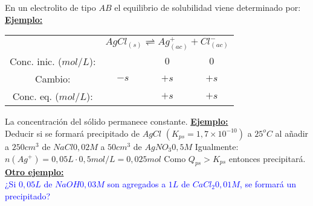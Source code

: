     \sangria{} En un electrolito de tipo $AB$ el equilibrio de solubilidad viene determinado por: \\
    \textbf{\underline{Ejemplo:}}
    \begin{center}
        \begin{tabular}{cccc}
            \multicolumn{1}{c}{} &
            \multicolumn{3}{c}{$AgCl_{(s)} \rightleftharpoons Ag^+_{(ac)} + Cl^-_{(ac)}$} \\

            \multicolumn{1}{c}{Conc. inic. ($mol/L$):} &
            \multicolumn{1}{c}{} &
            \multicolumn{1}{c}{$0$} &
            \multicolumn{1}{c}{$0$} \\

            \multicolumn{1}{c}{Cambio:} &
            \multicolumn{1}{c}{$-s$} &
            \multicolumn{1}{c}{$+s$} &
            \multicolumn{1}{c}{$+s$} \\ \midrule

            \multicolumn{1}{c}{Conc. eq. ($mol/L$):} &
            \multicolumn{1}{c}{} &
            \multicolumn{1}{c}{$+s$} &
            \multicolumn{1}{c}{$+s$} \\
            
        \end{tabular}
    \end{center}
    La concentración del sólido permanece constante.
    \textbf{\underline{Ejemplo:}} \\
    Deducir si se formará precipitado de $AgCl$ $(K_{ps} = 1,7 \times 10^{-10})$ a $25^oC$ al añadir a $250cm^3$ de $NaCl 0,02M$ a $50cm^3$ de $AgNO_3 0,5M$
    Igualmente: $n(Ag^+) = 0,05L \cdot 0,5 mol/L = 0,025 mol$
    Como $Q_{ps} > K_{ps}$ entonces precipitará. \\[5pt]
    \textbf{\underline{Otro ejemplo:}} \\[5pt]
    \textcolor{blue}{¿Si $0,05L$ de $NaOH 0,03M$ son agregados a $1L$ de $CaCl_2 0,01M$, se formará un precipitado?} \\
